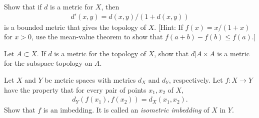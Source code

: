 \begin{exercise}[Munkres 20.11]
  Show that if $d$ is a metric for $X$, then
  \begin{align*}
    d'(x, y) = d(x, y)/(1 + d(x, y))
  \end{align*}
  is a bounded metric that gives the topology of $X$. [Hint: If $f(x) = x/(1 + x)$ for $x > 0$, use the mean-value theorem to show that $f(a + b) - f(b) \leq f(a)$.]
\end{exercise}

\begin{exercise}[Munkres 21.1]
  Let $A \subset X$. If $d$ is a metric for the topology of $X$, show that $d|A \times A$ is a metric for the subspace topology on $A$.
\end{exercise}

\begin{exercise}[Munkres 21.2]
  Let $X$ and $Y$ be metric spaces with metrics $d_X$ and $d_Y$, respectively. Let $f : X \to Y$ have the property that for every pair of points $x_1, x_2$ of $X$,
  \begin{align*}
    d_Y(f(x_1), f(x_2)) = d_X(x_1, x_2).
  \end{align*}
  Show that $f$ is an imbedding. It is called an \textit{isometric imbedding} of $X$ in $Y$.
\end{exercise}

